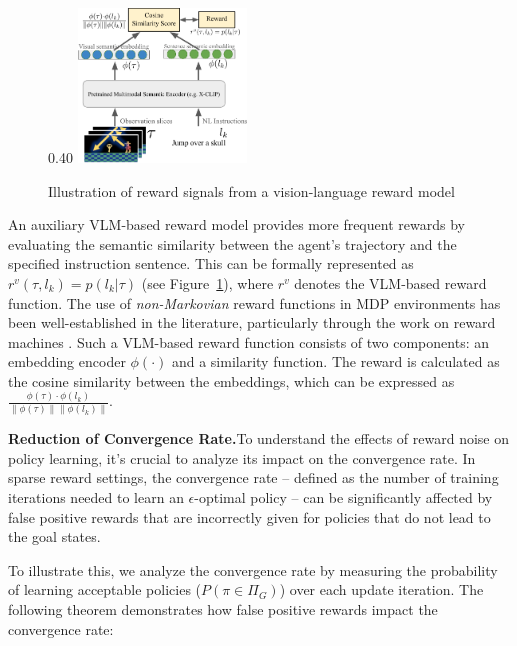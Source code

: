 \documentclass{article}
\theoremstyle{plain}
\theoremstyle{definition}
\theoremstyle{remark}
\begin{document}
\begin{figure}{0.40\textwidth}
    \centering
    \includegraphics[width=0.40\textwidth]{figures/illustration_of_vlm_reward.pdf}
    \caption{Illustration of reward signals from a vision-language reward model}
    \label{fig:illustration_of_vlm_reward}
\end{figure}


An auxiliary VLM-based reward model provides more frequent rewards by evaluating the semantic similarity between the agent's trajectory and the specified instruction sentence. This can be formally represented as $r^v(\tau, l_k) = p(l_k|\tau)$ (see Figure~\ref{fig:illustration_of_vlm_reward}), where $r^v$ denotes the VLM-based reward function. The use of \emph{non-Markovian} reward functions in MDP environments has been well-established in the literature, particularly through the work on reward machines \citep{Icarte2018UsingRM, Corazza2022ReinforcementLW}. Such a VLM-based reward function consists of two components: an embedding encoder $\phi(\cdot)$ and a similarity function. The reward is calculated as the cosine similarity between the embeddings, which can be expressed as $\frac{\phi(\tau) \cdot \phi(l_k)}{\|\phi(\tau)\| \|\phi(l_k)\|}$.



\noindent \textbf{Reduction of Convergence Rate.}\quad To understand the effects of reward noise on policy learning, it's crucial to analyze its impact on the convergence rate. In sparse reward settings, the convergence rate -- defined as the number of training iterations needed to learn an $\epsilon$-optimal policy -- can be significantly affected by false positive rewards that are incorrectly given for policies that do not lead to the goal states.

To illustrate this, we analyze the convergence rate by measuring the probability of learning acceptable policies ($P(\pi \in \Pi_G)$) over each update iteration. The following theorem demonstrates how false positive rewards impact the convergence rate:
\end{document}
